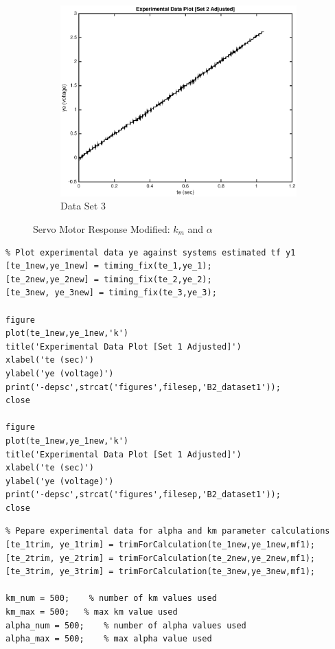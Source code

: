 \documentclass[11pt,a4paper]{article}
\begin{document}
\begin{enumerate}
\begin{figure}[H]
  \begin{subfigure}{0.5\textwidth}
  \includegraphics[width=0.9\linewidth]{Matlab_Figures/B2_dataset3.eps}
  \caption{Data Set 3}
  \label{fig:subim3}
  \end{subfigure}

  \caption{\label{fig:rand}Servo Motor Response Modified: $k_m$ and $\alpha$}
  \end{figure}
    

    \begin{lstlisting}
% Plot experimental data ye against systems estimated tf y1
[te_1new,ye_1new] = timing_fix(te_1,ye_1);
[te_2new,ye_2new] = timing_fix(te_2,ye_2);
[te_3new, ye_3new] = timing_fix(te_3,ye_3);

figure
plot(te_1new,ye_1new,'k')
title('Experimental Data Plot [Set 1 Adjusted]')
xlabel('te (sec)')
ylabel('ye (voltage)')
print('-depsc',strcat('figures',filesep,'B2_dataset1'));
close

figure
plot(te_1new,ye_1new,'k')
title('Experimental Data Plot [Set 1 Adjusted]')
xlabel('te (sec)')
ylabel('ye (voltage)')
print('-depsc',strcat('figures',filesep,'B2_dataset1'));
close
	\end{lstlisting}
	
    \begin{lstlisting}
% Pepare experimental data for alpha and km parameter calculations
[te_1trim, ye_1trim] = trimForCalculation(te_1new,ye_1new,mf1);
[te_2trim, ye_2trim] = trimForCalculation(te_2new,ye_2new,mf1);
[te_3trim, ye_3trim] = trimForCalculation(te_3new,ye_3new,mf1);

km_num = 500;    % number of km values used
km_max = 500;   % max km value used
alpha_num = 500;    % number of alpha values used
alpha_max = 500;    % max alpha value used
	\end{lstlisting}
   

\end{enumerate}
\end{document}
